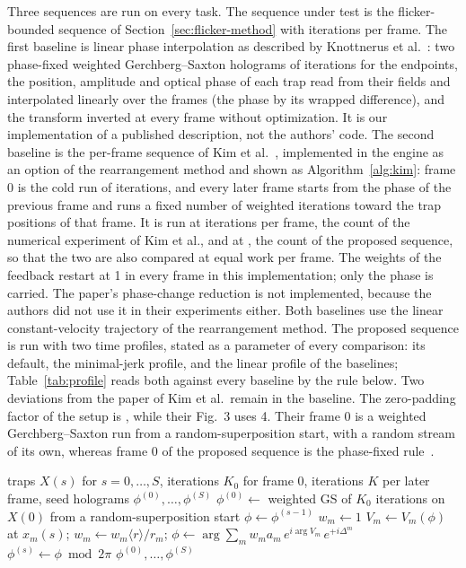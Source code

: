 Three sequences are run on every task. The sequence under test is the flicker-bounded sequence of Section~\ref{sec:flicker-method} with \parFrameIters{} iterations per frame. The first baseline is linear phase interpolation as described by Knottnerus et al.~\cite{lpi}: two phase-fixed weighted Gerchberg--Saxton holograms of \setupCold{} iterations for the endpoints, the position, amplitude and optical phase of each trap read from their fields and interpolated linearly over the frames (the phase by its wrapped difference), and the transform inverted at every frame without optimization. It is our implementation of a published description, not the authors' code. The second baseline is the per-frame sequence of Kim et al.~\cite{kimoe}, implemented in the engine as an option of the rearrangement method and shown as Algorithm~\ref{alg:kim}: frame 0 is the cold run of \setupCold{} iterations, and every later frame starts from the phase of the previous frame and runs a fixed number of weighted iterations toward the trap positions of that frame. It is run at \parKimIters{} iterations per frame, the count of the numerical experiment of Kim et al., and at \parFrameIters{}, the count of the proposed sequence, so that the two are also compared at equal work per frame. The weights of the feedback restart at 1 in every frame in this implementation; only the phase is carried. The paper's phase-change reduction is not implemented, because the authors did not use it in their experiments either. Both baselines use the linear constant-velocity trajectory of the rearrangement method. The proposed sequence is run with two time profiles, stated as a parameter of every comparison: its default, the minimal-jerk profile, and the linear profile of the baselines; Table~\ref{tab:profile} reads both against every baseline by the rule below. Two deviations from the paper of Kim et al.\ remain in the baseline. The zero-padding factor of the setup is \setupPad{}, while their Fig.~3 uses 4. Their frame 0 is a weighted Gerchberg--Saxton run from a random-superposition start, with a random stream of its own, whereas frame 0 of the proposed sequence is the phase-fixed rule~\cite{kimol}.

\begin{algorithm}[t]
\caption{Per-frame Gerchberg--Saxton with phase induction (Kim et al.), as run by the engine, for frames at the trap sets $X(0),\dots,X(S)$ on a linear trajectory.}
\label{alg:kim}
\begin{algorithmic}[1]
\Require traps $X(s)$ for $s=0,\dots,S$, iterations $K_0$ for frame 0, iterations $K$ per later frame, seed
\Ensure holograms $\phi^{(0)},\dots,\phi^{(S)}$
\State $\phi^{(0)}\gets$ weighted GS of $K_0$ iterations on $X(0)$ from a random-superposition start
  \State $\phi\gets\phi^{(s-1)}$ 
  \State $w_m\gets1$
    \State $V_m\gets V_m(\phi)$ at $x_m(s)$; $w_m\gets w_m\langle r\rangle/r_m$; $\phi\gets\arg\sum_mw_ma_m\,e^{i\arg V_m}\,e^{+i\Delta^m}$
  \EndFor
  \State $\phi^{(s)}\gets\phi\bmod2\pi$
\EndFor
\State \Return $\phi^{(0)},\dots,\phi^{(S)}$
\end{algorithmic}
\end{algorithm}


